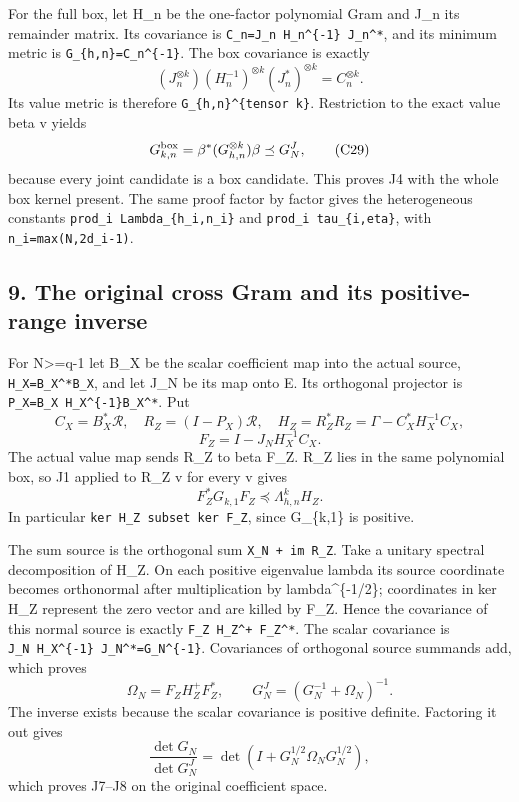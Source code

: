 \documentclass[11pt]{article}
\begin{document}
For the full box, let H\_n be the one-factor polynomial Gram and J\_n its remainder matrix. Its covariance is \texttt{C\_n=J\_n\ H\_n\^{}\{-1\}\ J\_n\^{}*}, and its minimum metric is \texttt{G\_\{h,n\}=C\_n\^{}\{-1\}}. The box covariance is exactly \[
(J_n^{\otimes k})(H_n^{-1})^{\otimes k}(J_n^*)^{\otimes k}
=C_n^{\otimes k}.
\] Its value metric is therefore \texttt{G\_\{h,n\}\^{}\{tensor\ k\}}. Restriction to the exact value beta v yields \[
G_{k,n}^{\rm box}=\beta^*(G_{h,n}^{\otimes k})\beta\preceq G_N^J,
\tag{C29}
\] because every joint candidate is a box candidate. This proves J4 with the whole box kernel present. The same proof factor by factor gives the heterogeneous constants \texttt{prod\_i\ Lambda\_\{h\_i,n\_i\}} and \texttt{prod\_i\ tau\_\{i,eta\}}, with \texttt{n\_i=max(N,2d\_i-1)}.

\subsection{9. The original cross Gram and its positive-range inverse}\label{the-original-cross-gram-and-its-positive-range-inverse}

For N\textgreater=q-1 let B\_X be the scalar coefficient map into the actual source, \texttt{H\_X=B\_X\^{}*B\_X}, and let J\_N be its map onto E. Its orthogonal projector is \texttt{P\_X=B\_X\ H\_X\^{}\{-1\}B\_X\^{}*}. Put \[
C_X=B_X^*\mathcal R,\quad
R_Z=(I-P_X)\mathcal R,\quad
H_Z=R_Z^*R_Z=\Gamma-C_X^*H_X^{-1}C_X,
\] \[
F_Z=I-J_NH_X^{-1}C_X.
\tag{C30}
\] The actual value map sends R\_Z to beta F\_Z. R\_Z lies in the same polynomial box, so J1 applied to R\_Z v for every v gives \[
F_Z^*G_{k,1}F_Z\preceq\Lambda_{h,n}^kH_Z.
\tag{C31}
\] In particular \texttt{ker\ H\_Z\ subset\ ker\ F\_Z}, since G\_\{k,1\} is positive.

The sum source is the orthogonal sum \texttt{X\_N\ +\ im\ R\_Z}. Take a unitary spectral decomposition of H\_Z. On each positive eigenvalue lambda its source coordinate becomes orthonormal after multiplication by lambda\^{}\{-1/2\}; coordinates in ker H\_Z represent the zero vector and are killed by F\_Z. Hence the covariance of this normal source is exactly \texttt{F\_Z\ H\_Z\^{}+\ F\_Z\^{}*}. The scalar covariance is \texttt{J\_N\ H\_X\^{}\{-1\}\ J\_N\^{}*=G\_N\^{}\{-1\}}. Covariances of orthogonal source summands add, which proves \[
\Omega_N=F_ZH_Z^+F_Z^*,\qquad
G_N^J=(G_N^{-1}+\Omega_N)^{-1}.
\tag{C32}
\] The inverse exists because the scalar covariance is positive definite. Factoring it out gives \[
\frac{\det G_N}{\det G_N^J}
=\det(I+G_N^{1/2}\Omega_NG_N^{1/2}),
\tag{C33}
\] which proves J7--J8 on the original coefficient space.
\end{document}
